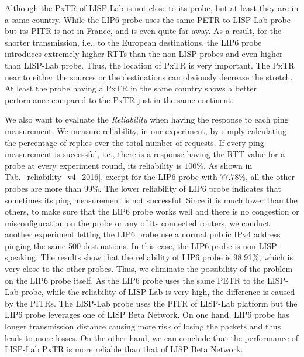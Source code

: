 Although the PxTR of LISP-Lab is not close to its probe, but at least they are in a same country. While the LIP6 probe uses the same PETR to LISP-Lab probe but its PITR is not in France, and is even quite far away. As a result, for the shorter transmission, i.e., to the European destinations, the LIP6 probe introduces extremely higher RTTs than the non-LISP probes and even higher than LISP-Lab probe. Thus, the location of PxTR is very important. The PxTR near to either the sources or the destinations can obviously decrease the stretch. At least the probe having a PxTR in the same country shows a better performance compared to the PxTR just in the same continent.

\begin{table}[!tb]
	\centering
	\caption{Reliability of each probe (IPv4) from Dataset 2016}
	\label{reliability_v4_2016}{
	}
\end{table}


We also want to evaluate the \emph{Reliability} when having the response to each ping measurement. We measure reliability, in our experiment, by simply calculating the percentage of replies over the total number of requests. If every ping measurement is successful, i.e., there is a response having the RTT value for a probe at every experiment round, its reliability is $100\%$. As shown in Tab.~\ref{reliability_v4_2016}, except for the LIP6 probe with $77.78\%$, all the other probes are more than $99\%$. The lower reliability of LIP6 probe indicates that sometimes its ping measurement is not successful. Since it is much lower than the others, to make sure that the LIP6 probe works well and there is no congestion or misconfiguration on the probe or any of its connected routers, we conduct another experiment letting the LIP6 probe use a normal public IPv4 address pinging the same 500 destinations. In this case, the LIP6 probe is non-LISP-speaking. The results show that the reliability of LIP6 probe is 98.91\%, which is very close to the other probes. Thus, we eliminate the possibility of the problem on the LIP6 probe itself. As the LIP6 probe uses the same PETR to the LISP-Lab probe, while the reliability of LISP-Lab is very high, the difference is caused by the PITRs. The LISP-Lab probe uses the PITR of LISP-Lab platform but the LIP6 probe leverages one of LISP Beta Network. On one hand, LIP6 probe has longer transmission distance causing more risk of losing the packets and thus leads to more losses. On the other hand, we can conclude that the performance of LISP-Lab PxTR is more reliable than that of LISP Beta Network.

